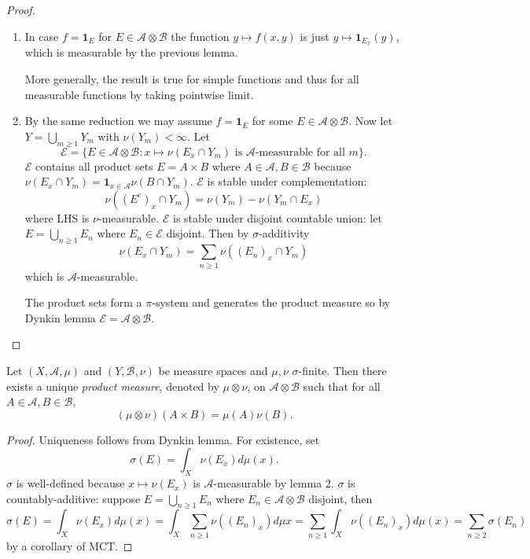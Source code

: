 \documentclass[a4paper]{article}
\begin{document}
\begin{proof}\leavevmode
  \begin{enumerate}
  \item In case \(f = \mathbf 1_E\) for \(E \in \mathcal A \otimes \mathcal B\) the function \(y \mapsto f(x, y)\) is just \(y \mapsto \mathbf 1_{E_x}(y)\), which is measurable by the previous lemma.

    More generally, the result is true for simple functions and thus for all measurable functions by taking pointwise limit.
  \item By the same reduction we may assume \(f = \mathbf 1_E\) for some \(E \in \mathcal A \otimes \mathcal B\). Now let \(Y = \bigcup_{m \geq 1} Y_m\) with \(\nu(Y_m) < \infty\). Let
    \[
      \mathcal E = \{E \in \mathcal A \otimes \mathcal B: x \mapsto \nu(E_x \cap Y_m) \text{ is \(\mathcal A\)-measurable for all } m\}.
    \]
    \(\mathcal E\) contains all product sets \(E = A \times B\) where \(A \in \mathcal A, B \in \mathcal B\) because \(\nu(E_x \cap Y_m) = \mathbf 1_{x \in \mathcal A} \nu(B \cap Y_m)\). \(\mathcal E\) is stable under complementation:
    \[
      \nu((E^c)_x \cap Y_m) = \nu(Y_m) - \nu(Y_m \cap E_x)
    \]
    where LHS is \(\nu\)-measurable. \(\mathcal E\) is stable under disjoint countable union: let \(E = \bigcup_{n \geq 1} E_n\) where \(E_n \in \mathcal E\) disjoint. Then by \(\sigma\)-additivity
    \[
      \nu(E_x \cap Y_m) = \sum_{n \geq 1} \nu((E_n)_x \cap Y_m)
    \]
    which is \(\mathcal A\)-measurable.

    The product sets form a \(\pi\)-system and generates the product measure so by Dynkin lemma \(\mathcal E = \mathcal A \otimes \mathcal B\).
  \end{enumerate}
\end{proof}

\begin{definition}
  Let \((X, \mathcal A, \mu)\) and \((Y, \mathcal B, \nu)\) be measure spaces and \(\mu, \nu\) \(\sigma\)-finite. Then there exists a unique \emph{product measure}, denoted by \(\mu \otimes \nu\), on \(\mathcal A \otimes \mathcal B\) such that for all \(A \in \mathcal A, B \in \mathcal B\),
  \[
    (\mu \otimes \nu) (A \times B) = \mu(A)\nu(B).
  \]
\end{definition}

\begin{proof}
  Uniqueness follows from Dynkin lemma. For existence, set
  \[
    \sigma(E) = \int_X \nu(E_x) d\mu(x).
  \]
  \(\sigma\) is well-defined because \(x \mapsto \nu(E_x)\) is \(\mathcal A\)-measurable by lemma 2. \(\sigma\) is countably-additive: suppose \(E = \bigcup_{n \geq 1} E_n\) where \(E_n \in \mathcal A \otimes \mathcal B\) disjoint, then
  \[
    \sigma(E)
    = \int_X \nu(E_x) d\mu(x)
    = \int_X \sum_{n \geq 1} \nu((E_n)_x) d\mu x
    = \sum_{n \geq 1} \int_X \nu((E_n)_x) d\mu(x)
    = \sum_{n \geq 2} \sigma(E_n)
  \]
  by a corollary of MCT.
\end{proof}
\end{document}
